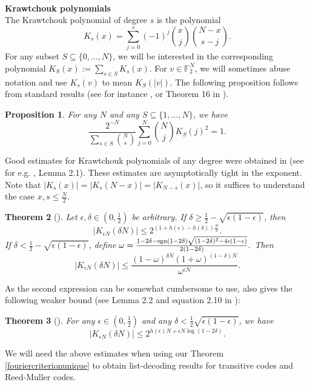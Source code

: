 \documentclass[12pt]{article}
\newtheorem{theorem}{Theorem}
\newtheorem{prop}[theorem]{Proposition}
\newcommand{\F}{\mathbb{F}}
\begin{document}
\hfill\\
\textbf{Krawtchouk polynomials}
\hfill\\
The Krawtchouk polynomial of degree $s$ is the polynomial
$$K_s(x)=\sum_{j=0}^s(-1)^j\binom{x}{j}\binom{N-x}{s-j}.$$ For any subset $S\subseteq \{0,...,N\}$, we will be interested in the corresponding polynomial $K_S(x):=\sum_{s\in S}K_s(x)$. For $v\in\F_2^N$, we will sometimes abuse notation and use $K_s(v)$ to mean $K_S(|v|)$.
The following proposition follows from standard results (see for instance \cite{1999surveykrawtchouk}, or Theorem 16 in \cite{1977bookkrawtchouk}). 
\begin{prop}\label{IFourier}
For any $N$ and any $S\subseteq\{1,...,N\}$, we have
   $$\frac{2^{-N}}{\sum_{s\in S}\binom{N}{s}}\sum_{j = 0}^N  \binom{N}{j}  K_S(j)^2=1.$$
\end{prop}
Good estimates for Krawtchouk polynomials of any degree were obtained in \cite{kallai1995krawtchouk1,ismail1998krawtchouk2,polyanskiy2019krawtchouk3} (see for e.g. \cite{polyanskiy2019krawtchouk3}, Lemma 2.1). These estimates are asymptotically tight in the exponent. Note that $|K_s(x)|=| K_s(N-x)|= |K_{N-s}(x)|$, so it suffices to understand the case $x,s\leq\frac{N}{2}$.
\begin{theorem}[\cite{kallai1995krawtchouk1,ismail1998krawtchouk2,polyanskiy2019krawtchouk3}]\label{thmkrawtchouktight}
Let $\epsilon,\delta\in(0,\frac{1}{2})$ be arbitrary. If $\delta\geq\frac{1}{2}- \sqrt{\epsilon(1-\epsilon)}$, then
$$|K_{\epsilon N}(\delta N)|\leq 2^{(1+h(\epsilon)-h(\delta))\frac{N}{2}}.$$
If $\delta<\frac{1}{2}- \sqrt{\epsilon(1-\epsilon)}$, define $\omega=\frac{1-2\delta-\textnormal{sgn}(1-2\delta)\sqrt{(1-2\delta)^2-4\epsilon(1-\epsilon)}}{2(1-2\delta)}.$ Then
$$|K_{\epsilon N}(\delta N)|\leq \frac{(1-\omega)^{\delta N}(1+\omega)^{(1-\delta)N}}{\omega^{\epsilon N}}.$$
\end{theorem}
As the second expression can be somewhat cumbersome to use, \cite{polyanskiy2019krawtchouk3} also gives the following weaker bound (see Lemma 2.2 and equation 2.10 in \cite{polyanskiy2019krawtchouk3}):
\begin{theorem}[\cite{polyanskiy2019krawtchouk3}]\label{thmkrawtchoukbound}
For any $\epsilon \in(0,\frac{1}{2})$ and any $\delta<\frac{1}{2}\sqrt{\epsilon(1-\epsilon)}$, we have
$$|K_{\epsilon N}(\delta N)|\leq 2^{h(\epsilon)N+\epsilon N\log(1-2\delta)}.$$
\end{theorem}
We will need the above estimates when using our Theorem \ref{fouriercriterionunique} to obtain list-decoding results for transitive codes and Reed-Muller codes.
\end{document}
